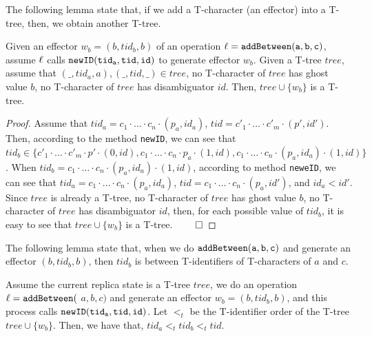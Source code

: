 The following lemma state that, if we add a T-character (an effector) into a T-tree, then, we obtain another T-tree.

\begin{lemma}
\label{lemma:if we add a T-character (an effector) into a T-tree, then we obtain another T-tree}
Given an effector $w_b = (b,tid_b,b)$ of an operation $\alabel = \alabelshort[{\tt addBetween}]{a,b,c}$, assume $\ell$ calls $\alabelshort[{\tt newID}]{tid_a,tid,id}$ to generate effector $w_b$. Given a T-tree $tree$, assume that $(\_,tid_a,a),(\_,tid,\_) \in tree$, no T-character of $tree$ has ghost value $b$, no T-character of $tree$ has disambiguator $id$. Then, $tree \cup \{ w_b \}$ is a T-tree.
\end{lemma}

\begin {proof}
Assume that $tid_a = c_1 \cdot \ldots \cdot c_n \cdot (p_a,id_a)$, $tid = c'_1 \cdot \ldots \cdot c'_m \cdot (p',id')$. Then, according to the method {\tt newID}, we can see that $tid_b \in \{ c'_1 \cdot \ldots \cdot c'_m \cdot p' \cdot (0,id), c_1 \cdot \ldots \cdot c_n \cdot p_a \cdot (1,id), c_1 \cdot \ldots \cdot c_n \cdot (p_a,id_a) \cdot (1,id) \}$. When $tid_b = c_1 \cdot \ldots \cdot c_n \cdot (p_a,id_a) \cdot (1,id)$, according to method {\tt neweID}, we can see that $tid_a = c_1 \cdot \ldots \cdot c_n \cdot (p_a,id_a)$, $tid = c_1 \cdot \ldots \cdot c_n \cdot (p_a,id')$, and $id_a < id'$. Since $tree$ is already a T-tree, no T-character of $tree$ has ghost value $b$, no T-character of $tree$ has disambiguator $id$, then, for each possible value of $tid_b$, it is easy to see that $tree \cup \{ w_b \}$ is a T-tree. $\qed$
\end {proof}

The following lemma state that, when we do $\alabelshort[{\tt addBetween}]{a,b,c}$ and generate an effector $(b,tid_b,b)$, then $tid_b$ is between T-identifiers of T-characters of $a$ and $c$.

\begin{lemma}
\label{lemma:when we do addBetween(a,b,c) and generate an effector (b,tid_b,b) with newID(tid_a,tid_x,id), then tid_b is between tid_a and tid_x}
Assume the current replica state is a T-tree $tree$, we do an operation $\ell = {\tt addBetween}($ $a,b,c)$ and generate an effector $w_b = (b,tid_b,b)$, and this process calls $\alabelshort[{\tt newID}]{tid_a,tid,id}$. Let $<_t$ be the T-identifier order of the T-tree $tree \cup \{ w_b \}$. Then, we have that, $tid_a <_t tid_b <_t tid$.
\end{lemma}

